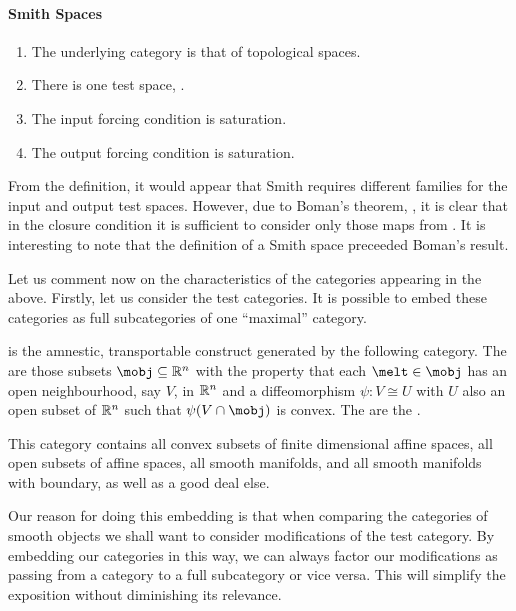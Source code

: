 \documentclass[%
12pt,%
arxiv,%
defaults
]{myclass}
\begin{document}
\paragraph{Smith Spaces}

\begin{enumerate}
\item The underlying category is that of topological spaces.
\item There is one test space, \R.
\item The input forcing condition is saturation.
\item The output forcing condition is saturation.
\end{enumerate}

From the definition, it would appear that Smith requires different families for the input and output test spaces.
However, due to Boman's theorem, \cite{jb3}, it is clear that in the closure condition it is sufficient to consider only those maps from \R.
It is interesting to note that the definition of a Smith space preceeded Boman's result.


\medskip

Let us comment now on the characteristics of the categories appearing in the above.
Firstly, let us consider the test categories.
It is possible to embed these categories as full subcategories of one ``maximal'' category.

\begin{defn}
\emph{\mcatu{}} is the amnestic, transportable construct generated by the following category.
The \mobjs are those subsets \(\mobj \subseteq \R^n\) with the property that each \(\melt \in \mobj\) has an open neighbourhood, say \(V\), in \(\mathbb{R}^n\) and a diffeomorphism \(\psi \colon V \cong U\) with \(U\) also an open subset of \(\mathbb{R}^n\) such that \(\psi(V \cap \mobj)\) is convex.
The \mmoralts are the \cimaps.
\end{defn}

This category contains all convex subsets of finite dimensional affine spaces, all open subsets of affine spaces, all smooth manifolds, and all smooth manifolds with boundary, as well as a good deal else.

Our reason for doing this embedding is that when comparing the categories of smooth objects we shall want to consider modifications of the test category.
By embedding our categories in this way, we can always factor our modifications as passing from a category to a full subcategory or vice versa.
This will simplify the exposition without diminishing its relevance.
\end{document}
